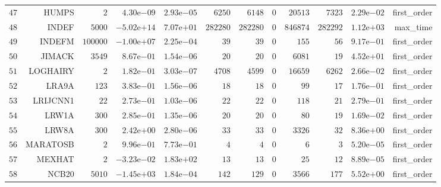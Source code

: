 \begin{longtable}{rrrrrrrrrrrr}
  \(    47\) & HUMPS & \(     2\) & \( 4.30\)e\(-09\) & \( 2.93\)e\(-05\) & \(  6250\) & \(  6148\) & \(     0\) & \( 20513\) & \(  7323\) & \( 2.29\)e\(-02\) & first\_order \\
  \(    48\) & INDEF & \(  5000\) & \(-5.02\)e\(+14\) & \( 7.07\)e\(+01\) & \(282280\) & \(282280\) & \(     0\) & \(846874\) & \(282292\) & \( 1.12\)e\(+03\) & max\_time \\
  \(    49\) & INDEFM & \(100000\) & \(-1.00\)e\(+07\) & \( 2.25\)e\(-04\) & \(    39\) & \(    39\) & \(     0\) & \(   155\) & \(    56\) & \( 9.17\)e\(-01\) & first\_order \\
  \(    50\) & JIMACK & \(  3549\) & \( 8.67\)e\(-01\) & \( 1.54\)e\(-06\) & \(    20\) & \(    20\) & \(     0\) & \(  6081\) & \(    19\) & \( 4.52\)e\(+01\) & first\_order \\
  \(    51\) & LOGHAIRY & \(     2\) & \( 1.82\)e\(-01\) & \( 3.03\)e\(-07\) & \(  4708\) & \(  4599\) & \(     0\) & \( 16659\) & \(  6262\) & \( 2.66\)e\(-02\) & first\_order \\
  \(    52\) & LRA9A & \(   123\) & \( 3.83\)e\(-01\) & \( 1.56\)e\(-06\) & \(    18\) & \(    18\) & \(     0\) & \(    99\) & \(    17\) & \( 1.76\)e\(-01\) & first\_order \\
  \(    53\) & LRIJCNN1 & \(    22\) & \( 2.73\)e\(-01\) & \( 1.03\)e\(-06\) & \(    22\) & \(    22\) & \(     0\) & \(   118\) & \(    21\) & \( 2.79\)e\(-01\) & first\_order \\
  \(    54\) & LRW1A & \(   300\) & \( 2.85\)e\(-01\) & \( 1.35\)e\(-06\) & \(    20\) & \(    20\) & \(     0\) & \(    80\) & \(    19\) & \( 1.69\)e\(-02\) & first\_order \\
  \(    55\) & LRW8A & \(   300\) & \( 2.42\)e\(+00\) & \( 2.80\)e\(-06\) & \(    33\) & \(    33\) & \(     0\) & \(  3326\) & \(    32\) & \( 8.36\)e\(+00\) & first\_order \\
  \(    56\) & MARATOSB & \(     2\) & \( 9.96\)e\(-01\) & \( 7.73\)e\(-01\) & \(     4\) & \(     4\) & \(     0\) & \(     6\) & \(     3\) & \( 5.20\)e\(-05\) & first\_order \\
  \(    57\) & MEXHAT & \(     2\) & \(-3.23\)e\(-02\) & \( 1.83\)e\(+02\) & \(    13\) & \(    13\) & \(     0\) & \(    25\) & \(    12\) & \( 8.89\)e\(-05\) & first\_order \\
  \(    58\) & NCB20 & \(  5010\) & \(-1.45\)e\(+03\) & \( 1.84\)e\(-04\) & \(   142\) & \(   129\) & \(     0\) & \(  3566\) & \(   177\) & \( 5.52\)e\(+00\) & first\_order \\

\end{longtable}
